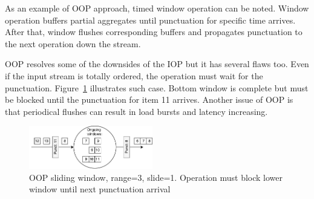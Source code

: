 As an example of OOP approach, timed window operation can be noted. Window operation buffers partial aggregates until punctuation for specific time arrives. After that, window flushes corresponding buffers and propagates punctuation to the next operation down the stream.

OOP resolves some of the downsides of the IOP but it has several flaws too. Even if the input stream is totally ordered, the operation must wait for the punctuation. Figure~\ref{oop} illustrates such case. Bottom window is complete but must be blocked until the punctuation for item 11 arrives. Another issue of OOP is that periodical flushes can result in load bursts and latency increasing. 

\begin{figure}[htbp]
  \centering
  \includegraphics[width=0.48\textwidth]{pics/oop}
  \caption{OOP sliding window, range=3, slide=1. Operation must block lower window until next punctuation arrival }
  \label {oop}
\end{figure}
